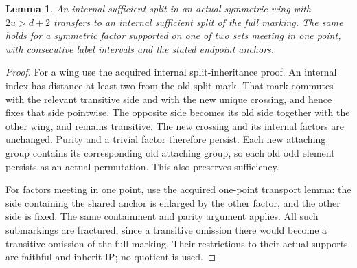 \documentclass[11pt,a4paper]{article}
\newtheorem{lemma}{Lemma}\newtheorem{theorem}[lemma]{Theorem}
\begin{document}
\begin{lemma}\label{transport}
An internal sufficient split in an actual symmetric wing
with $2u>d+2$ transfers to an internal sufficient split of
the full marking. The same holds for a symmetric factor
supported on one of two sets meeting in one point, with
consecutive label intervals and the stated endpoint anchors.
\end{lemma}
\begin{proof}
For a wing use the acquired internal split-inheritance proof.
An internal index has distance at least two from the old
split mark. That mark commutes with the relevant transitive
side and with the new unique crossing, and hence fixes that
side pointwise. The opposite side becomes its old side
together with the other wing, and remains transitive.
The new crossing and its internal factors are unchanged.
Purity and a trivial factor therefore persist. Each new
attaching group contains its corresponding old attaching
group, so each old odd element persists as an actual
permutation. This also preserves sufficiency.

For factors meeting in one point, use the acquired one-point
transport lemma: the side containing the shared anchor is
enlarged by the other factor, and the other side is fixed.
The same containment and parity argument applies. All such
submarkings are fractured, since a transitive omission there
would become a transitive omission of the full marking.
Their restrictions to their actual supports are faithful
and inherit IP; no quotient is used.
\end{proof}
\end{document}
